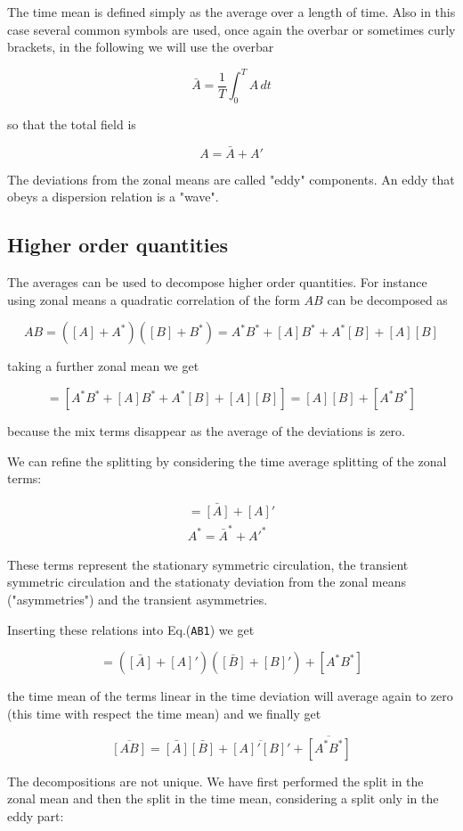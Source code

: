 The time mean is defined simply as the average over a length of time.
Also in this case several common symbols are used, once again the
overbar or sometimes curly brackets, in the following we will use the
overbar

\[\bar{A} = \frac{1}{T}\int_0^{T} A \, dt\]

so that the total field is

\[A = \bar{A} + A'\]

The deviations from the zonal means are called "eddy" components. An
eddy that obeys a dispersion relation is a "wave".

\subsection{Higher order quantities}\label{Sect:Higher}

The averages can be used to decompose higher order quantities. For
instance using zonal means a quadratic correlation of the form \(A B\)
can be decomposed as

\[A B = ([A]+A^*)([B]+B^*) = A^*B^* + [A] B^*+ A^*[B] + [A][B]\]

taking a further zonal mean we get

{\[= [A^*B^*+ [A]B^* + A^*[B] + [A][B]] =  [A][B] + [A^*B^*]\]}

because the mix terms disappear as the average of the deviations is
zero.

We can refine the splitting by considering the time average splitting of
the zonal terms:

\[\begin{aligned}
= \bar{[A]} + [A]' \\
A^* = \bar{A}^* + A'^*
\end{aligned}\]

These terms represent the stationary symmetric circulation, the
transient symmetric circulation and the stationaty deviation from the
zonal means ("asymmetries") and the transient asymmetries.

Inserting these relations into Eq.(\texttt{AB1}) we get

\[= (\bar{[A]} + [A]')(\bar{[B]} + [B]') + [A^*B^*]\]

the time mean of the terms linear in the time deviation will average
again to zero (this time with respect the time mean) and we finally get

\[\overline{[AB]} = \bar{[A]}\bar{[B]} + \overline{[A]'[B]'} + \overline{[A^*B^*]}\]

The decompositions are not unique. We have first performed the split in
the zonal mean and then the split in the time mean, considering a split
only in the eddy part:

